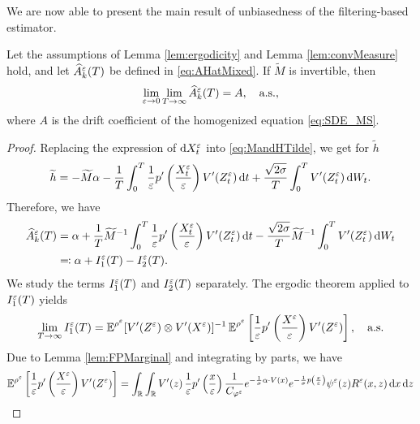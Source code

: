 \documentclass[10pt]{article}
\begin{document}
We are now able to present the main result of unbiasedness of the filtering-based estimator.
\begin{theorem}\label{thm:mainTheorem} Let the assumptions of Lemma \ref{lem:ergodicity} and Lemma \ref{lem:convMeasure} hold, and let $\widehat A^\varepsilon_k(T)$ be defined in \eqref{eq:AHatMixed}. If $\widetilde M$ is invertible, then
	\begin{equation}
	\lim_{\varepsilon \to 0} \lim_{T \to \infty} \widehat A_k^\varepsilon(T) = A, \quad \text{a.s.},
	\end{equation}
	where $A$ is the drift coefficient of the homogenized equation \eqref{eq:SDE_MS}.
\end{theorem}

\begin{proof} Replacing the expression of $\mathrm{d} X^\varepsilon_t$ into \eqref{eq:MandHTilde}, we get for $\widetilde h$
\begin{equation}\label{Ahat_decomposition}
\widetilde h = -\widetilde M \alpha - \frac{1}{T} \int_0^T \frac{1}{\varepsilon} p' \left ( \frac{X^\varepsilon_t}{\varepsilon} \right ) V'(Z^\varepsilon_t) \,\mathrm{d} t + \frac{\sqrt{2\sigma}}{T} \int_0^T V'(Z^\varepsilon_t) \,\mathrm{d} W_t.
\end{equation}
Therefore, we have
\begin{equation}\label{eq:alphaDecomposition}
\begin{aligned}
	\widehat A^\varepsilon_k(T) &= \alpha + \frac{1}{T} \widetilde M^{-1} \int_0^T \frac{1}{\varepsilon} p' \left ( \frac{X^\varepsilon_t}{\varepsilon} \right ) V'(Z^\varepsilon_t) \,\mathrm{d} t - \frac{\sqrt{2\sigma}}{T}  \widetilde M^{-1} \int_0^T V'(Z^\varepsilon_t) \,\mathrm{d} W_t\\
	&\eqqcolon \alpha + I_1^\varepsilon(T) - I_2^\varepsilon(T).
\end{aligned}
\end{equation}
We study the terms $I_1^\varepsilon(T)$ and $I_2^\varepsilon(T)$ separately. The ergodic theorem applied to $I_1^\varepsilon(T)$ yields
\begin{equation}\label{limit_estimator}
\lim_{T \to \infty} I_1^\varepsilon(T) = \operatorname{\mathbb{E}}^{\rho^\varepsilon} [V'(Z^\varepsilon) \otimes V'(X^\varepsilon)]^{-1} \operatorname{\mathbb{E}}^{\rho^\varepsilon} \left [ \frac{1}{\varepsilon} p' \left ( \frac{X^\varepsilon}{\varepsilon} \right ) V'(Z^\varepsilon) \right ], \quad \text{a.s.}
\end{equation}
Due to Lemma \ref{lem:FPMarginal} and integrating by parts, we have
\begin{equation}
\begin{aligned}
	\E^{\rho^\epl} \left [ \frac{1}{\epl} p' \left ( \frac{X^\epl}{\epl} \right ) V'(Z^\epl) \right ] &= \int_{\R} \int_{\R} V'(z) \, \frac1\epl p' \left ( \frac{x}\epl \right ) \frac{1}{C_{\phi^\epl}} e^{- \frac{1}{\sigma} \alpha \cdot V(x)} e^{ - \frac{1}{\sigma} p \left ( \frac{x}\epl \right)} \psi^\epl(z) R^\epl(x,z) \dd x \dd z \\

\end{aligned}
\end{equation}
\end{proof}
\end{document}
